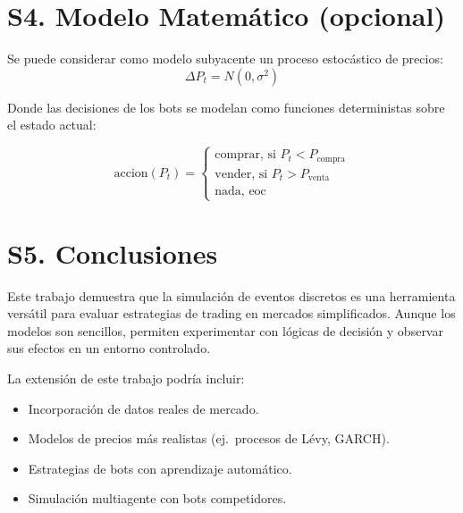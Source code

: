 \documentclass[a4paper,12pt]{article}
\begin{document}
\section*{S4. Modelo Matemático (opcional)}

Se puede considerar como modelo subyacente un proceso estocástico de precios:
\begin{equation*}
\Delta P_t = N(0, \sigma^2)
\end{equation*}

Donde las decisiones de los bots se modelan como funciones deterministas sobre el estado actual:

\[\text{accion}(P_t) = 
    \begin{cases}  
        \text{comprar, si }P_t < P_{\text{compra}}\\
        \text{vender, si }P_t > P_{\text{venta}}\\
        \text{nada, eoc}
    \end{cases} 
\]

\section*{S5. Conclusiones}

Este trabajo demuestra que la simulación de eventos discretos es una herramienta 
versátil para evaluar estrategias de trading en mercados simplificados. Aunque 
los modelos son sencillos, permiten experimentar con lógicas de decisión y 
observar sus efectos en un entorno controlado.

La extensión de este trabajo podría incluir:
\begin{itemize}
\item Incorporación de datos reales de mercado.
\item Modelos de precios más realistas (ej.\ procesos de Lévy, GARCH).
\item Estrategias de bots con aprendizaje automático.
\item Simulación multiagente con bots competidores.
\end{itemize}
\end{document}
